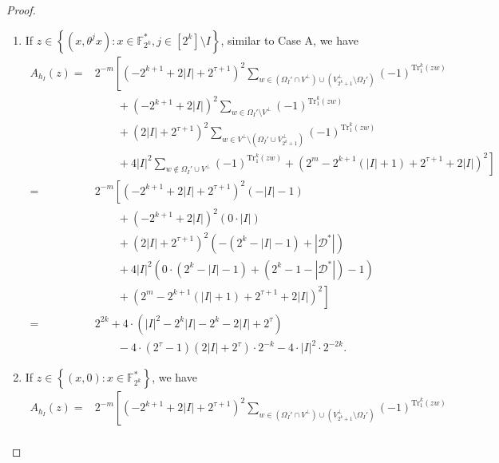 \documentclass[10pt]{article}
\newcommand{\F}{\mathbb{F}}
\newcommand{\0}{\textbf{0}}
\newcommand{\1}{\textbf{1}}
\newcommand{\tr}{\mathrm{Tr}_1^k}
\newcommand{\CardI}{\left|I\right|}
\begin{document}
{{\begin{proof}
\begin{enumerate}[label=\textbf{Case \Alph{*}}]
\begin{align*}
        &\qquad-4\cdot\CardI\cdot\left( 2\CardI^2+\left( 2^{\tau+2}+1 \right)\CardI+2^{2\tau+1} \right)\cdot 2^{-2k}
    \end{align*}
    \item If $z\in\left\{ (x,\theta^jx):x\in\F_{2^k}^*,j\in\left[ 2^k \right]\setminus I \right\}$, similar to Case A, we have 
    \begin{align*}
        A_{h_I}(z)= & 
        2^{-m}\left[  \left( -2^{k+1}+2\CardI+2^{\tau+1} \right)^2\sum_{w\in\left( \Omega_I'\cap V^{\perp}\right)\cup \left( V_{2^k+1}^{\perp}\setminus\Omega_I' \right)}(-1)^{\tr(zw)}\right.\\
        &\qquad+\left( -2^{k+1}+2\CardI \right)^2\sum_{w\in\Omega_I'\setminus V^{\perp}}(-1)^{\tr(zw)}\\
        &\qquad+\left( 2\CardI+2^{\tau+1} \right)^2\sum_{w\in V^{\perp}\setminus\left( \Omega_I'\cup V_{2^k+1}^{\perp} \right)}(-1)^{\tr(zw)}\\
        &\left.\qquad+4\CardI^2\sum_{w\not\in\Omega_I'\cup V^{\perp}}(-1)^{\tr(zw)}+\left( 2^m-2^{k+1}\left(\CardI+1\right)+2^{\tau+1}+2\CardI \right)^2\right]\\
        =& 2^{-m}\left[ \left( -2^{k+1}+2\CardI+2^{\tau+1} \right)^2 \left( -\CardI-1 \right) \right.\\
        &\qquad+\left( -2^{k+1}+2\CardI \right)^2 \left( 0\cdot\CardI \right) \\
        &\qquad+\left( 2\CardI+2^{\tau+1} \right)^2 \left( -\left( 2^k-\CardI-1 \right)+\left|\mathcal{D}^*\right| \right)\\
        &\qquad+4\CardI^2 \left( 0\cdot\left( 2^k-\CardI-1 \right) + \left( 2^k-1-\left|\mathcal{D}^*\right| \right) -1 \right)\\
        &\left.\qquad+\left( 2^m-2^{k+1}\left(\CardI+1\right)+2^{\tau+1}+2\CardI \right)^2\right]\\
        =& 2^{2k} + 4\cdot\left( \CardI^2-2^k\CardI-2^k-2\CardI+ 2^{\tau} \right)\\ 
        &\qquad- 4\cdot\left( 2^{\tau}-1 \right)\left( 2\CardI+2^{\tau} \right)\cdot 2^{-k} - 4\cdot\CardI^2\cdot 2^{-2k}.
    \end{align*}
    \item If $z\in\left\{ (x,0):x\in\F_{2^k}^* \right\}$, we have 
    \begin{align*}
        A_{h_I}(z)= & 
        2^{-m}\left[  \left( -2^{k+1}+2\CardI+2^{\tau+1} \right)^2\sum_{w\in\left( \Omega_I'\cap V^{\perp}\right)\cup \left( V_{2^k+1}^{\perp}\setminus\Omega_I' \right)}(-1)^{\tr(zw)}\right.\\

\end{align*}
\end{enumerate}
\end{proof}}}
\end{document}
